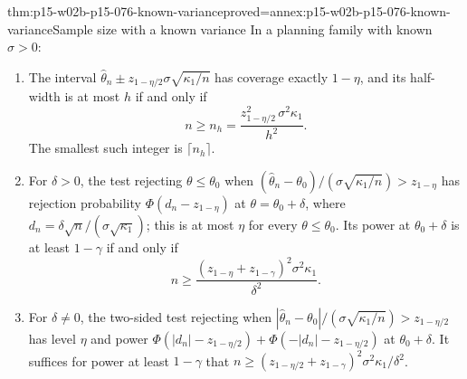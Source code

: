 \begin{hbtheorem}{thm:p15-w02b-p15-076-known-variance}{proved=annex:p15-w02b-p15-076-known-variance}{Sample size with a known variance}
In a planning family with known \(\sigma>0\):
\begin{enumerate}
\item The interval \(\widehat\theta_n\pm z_{1-\eta/2}\sigma\sqrt{\kappa_1/n}\)
      has coverage exactly \(1-\eta\), and its half-width is at most \(h\)
      if and only if
      \[
       n\geq n_h=\frac{z_{1-\eta/2}^2\,\sigma^2\kappa_1}{h^2}.
      \]
      The smallest such integer is \(\lceil n_h\rceil\).
\item For \(\delta>0\), the test rejecting \(\theta\leq\theta_0\) when
      \((\widehat\theta_n-\theta_0)/(\sigma\sqrt{\kappa_1/n})>z_{1-\eta}\)
      has rejection probability \(\Phi(d_n-z_{1-\eta})\) at
      \(\theta=\theta_0+\delta\), where \(d_n=\delta\sqrt n/(\sigma\sqrt{\kappa_1})\);
      this is at most \(\eta\) for every \(\theta\leq\theta_0\). Its power at
      \(\theta_0+\delta\) is at least \(1-\gamma\) if and only if
      \[
       n\geq\frac{(z_{1-\eta}+z_{1-\gamma})^2\sigma^2\kappa_1}{\delta^2}.
      \]
\item For \(\delta\ne0\), the two-sided test rejecting when
      \(|\widehat\theta_n-\theta_0|/(\sigma\sqrt{\kappa_1/n})>z_{1-\eta/2}\)
      has level \(\eta\) and power
      \(\Phi(|d_n|-z_{1-\eta/2})+\Phi(-|d_n|-z_{1-\eta/2})\) at
      \(\theta_0+\delta\). It suffices for power at least \(1-\gamma\) that
      \(n\geq(z_{1-\eta/2}+z_{1-\gamma})^2\sigma^2\kappa_1/\delta^2\).
\end{enumerate}
\end{hbtheorem}

